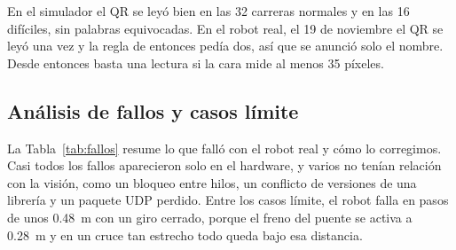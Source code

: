 \documentclass[11pt,a4paper]{article}
\begin{document}
En el simulador el QR se leyó bien en las 32 carreras normales y en las 16 difíciles, sin palabras equivocadas. En el robot real, el 19 de noviembre el QR se leyó una vez y la regla de entonces pedía dos, así que se anunció solo el nombre. Desde entonces basta una lectura si la cara mide al menos 35 píxeles.

\subsection{Análisis de fallos y casos límite}
\label{sec:fallos}

La Tabla~\ref{tab:fallos} resume lo que falló con el robot real y cómo lo corregimos. Casi todos los fallos aparecieron solo en el hardware, y varios no tenían relación con la visión, como un bloqueo entre hilos, un conflicto de versiones de una librería y un paquete UDP perdido. Entre los casos límite, el robot falla en pasos de unos \SI{0,48}{\meter} con un giro cerrado, porque el freno del puente se activa a \SI{0,28}{\meter} y en un cruce tan estrecho todo queda bajo esa distancia.
\end{document}
